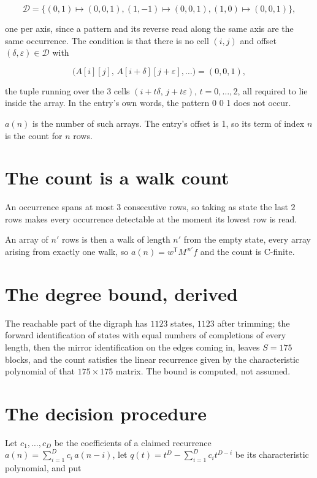 \documentclass[11pt]{article}
\theoremstyle{definition}
\begin{document}
\[\mathcal{D} = \{(0,1)\mapsto(0,0,1), (1,-1)\mapsto(0,0,1), (1,0)\mapsto(0,0,1)\},\]

one per axis, since a pattern and its reverse read along the same axis are the same occurrence. The condition is that there is no cell $(i,j)$ and offset $(\delta,\varepsilon)\in\mathcal{D}$ with

\[\bigl(A[i][j],\,A[i{+}\delta][j{+}\varepsilon],\dots\bigr) = (0, 0, 1),\]

the tuple running over the $3$ cells $(i+t\delta,\,j+t\varepsilon)$, $t = 0,\dots,2$, all required to lie inside the array. In the entry's own words, the pattern 0 0 1 does not occur.

$a(n)$ is the number of such arrays. The entry's offset is 1, so its term of index $n$ is the count for $n$ rows.

\section{The count is a walk count}

An occurrence spans at most $3$ consecutive rows, so taking as state the last $2$ rows makes every occurrence detectable at the moment its lowest row is read.

An array of $n'$ rows is then a walk of length $n'$ from the empty state, every array arising from exactly one walk, so $a(n) = w^{\mathsf T}M^{\,n'}f$ and the count is C-finite.

\section{The degree bound, derived}

The reachable part of the digraph has $1123$ states, $1123$ after trimming; the forward identification of states with equal numbers of completions of every length, then the mirror identification on the edges coming in, leaves $S = 175$ blocks, and the count satisfies the linear recurrence given by the characteristic polynomial of that $175\times175$ matrix. The bound is computed, not assumed.

\section{The decision procedure}

Let $c_1,\dots,c_D$ be the coefficients of a claimed recurrence $a(n) = \sum_{i=1}^{D} c_i\,a(n-i)$, let $q(t) = t^{D} - \sum_{i=1}^{D} c_i t^{D-i}$ be its characteristic polynomial, and put
\end{document}
